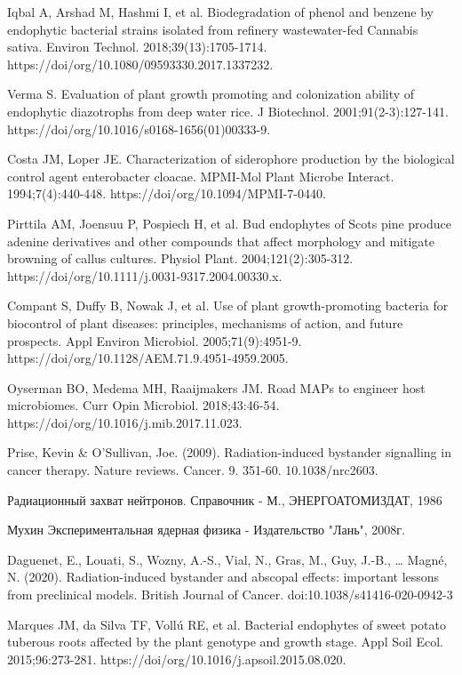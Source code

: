 \documentclass[11pt]{article}
\begin{document}
\begin{thebibliography}{3}
		 Iqbal A, Arshad M, Hashmi I, et al. Biodegradation of phenol and benzene by endophytic bacterial strains isolated from refinery wastewater-fed Cannabis sativa. Environ Technol. 2018;39(13):1705-1714. https://doi/org/10.1080/09593330.2017.1337232.
		
		 Verma S. Evaluation of plant growth promoting and colonization ability of endophytic diazotrophs from deep water rice. J Biotechnol. 2001;91(2-3):127-141. https://doi/org/10.1016/s0168-1656(01)00333-9.
		
		 Costa JM, Loper JE. Characterization of siderophore production by the biological control agent enterobacter cloacae. MPMI-Mol Plant Microbe Interact. 1994;7(4):440-448. https://doi/org/10.1094/MPMI-7-0440.
		
		 Pirttila AM, Joensuu P, Pospiech H, et al. Bud endophytes of Scots pine produce adenine derivatives and other compounds that affect morphology and mitigate browning of callus cultures. Physiol Plant. 2004;121(2):305-312. https://doi/org/10.1111/j.0031-9317.2004.00330.x.
		
		 Compant S, Duffy B, Nowak J, et al. Use of plant growth-promoting bacteria for biocontrol of plant diseases: principles, mechanisms of action, and future prospects. Appl Environ Microbiol. 2005;71(9):4951-9. https://doi/org/10.1128/AEM.71.9.4951-4959.2005.
		
		 Oyserman BO, Medema MH, Raaijmakers JM. Road MAPs to engineer host microbiomes. Curr Opin Microbiol. 2018;43:46-54. https://doi/org/10.1016/j.mib.2017.11.023.
		
		 Prise, Kevin \& O'Sullivan, Joe. (2009). Radiation-induced bystander signalling in cancer therapy. Nature reviews. Cancer. 9. 351-60. 10.1038/nrc2603. 
		
		 Радиационный захват нейтронов. Справочник - М., ЭНЕРГОАТОМИЗДАТ, 1986
		
		  Мухин Экспериментальная ядерная физика - 
		Издательство "Лань", 2008г.
		
		 Daguenet, E., Louati, S., Wozny, A.-S., Vial, N., Gras, M., Guy, J.-B., … Magné, N. (2020). Radiation-induced bystander and abscopal effects: important lessons from preclinical models. British Journal of Cancer. doi:10.1038/s41416-020-0942-3 
		
		 Marques JM, da Silva TF, Vollú RE, et al. Bacterial endophytes of sweet potato tuberous roots affected by the plant genotype and growth stage. Appl Soil Ecol. 2015;96:273-281. https://doi/org/10.1016/j.apsoil.2015.08.020.
		

\end{thebibliography}
\end{document}
